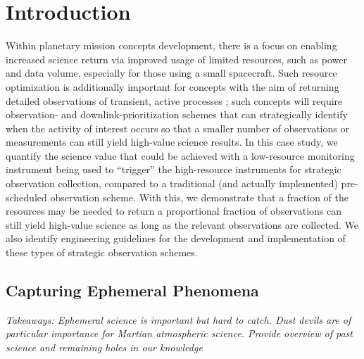 \section{Introduction} 
\label{sec:Introduction}

Within planetary mission concepts development, there is a focus on enabling increased science return via improved usage of limited resources, such as power and data volume, especially for those using a small spacecraft.  
Such resource optimization is additionally important for concepts with the aim of returning detailed observations of transient, active processes \cite{MCESAG}; such concepts will require observation- and downlink-prioritization schemes that can strategically identify when the activity of interest occurs so that a smaller number of observations or measurements can still yield high-value science results.
In this case study, we quantify the science value that could be achieved with a low-resource monitoring instrument being used to ``trigger'' the high-resource instruments for strategic observation collection, compared to a traditional (and actually implemented) pre-scheduled observation scheme. 
With this, we demonstrate that a fraction of the resources may be needed to return a proportional fraction of observations can still yield high-value science as long as the relevant observations are collected.
We also identify engineering guidelines for the development and implementation of these types of strategic observation schemes.

\subsection{Capturing Ephemeral Phenomena}
\textit{Takeaways: Ephemeral science is important but hard to catch. Dust devils are of particular importance for Martian atmospheric science. Provide overview of past science and remaining holes in our knowledge}

